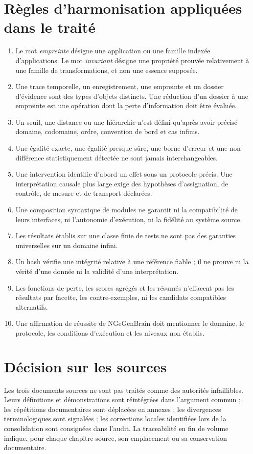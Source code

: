 \documentclass[11pt,oneside]{book}
\theoremstyle{definition}
\theoremstyle{remark}
\newcommand{\1}{\mathbf 1}
\begin{document}
\section{Règles d'harmonisation appliquées dans le traité}
\begin{enumerate}[label=\arabic*.]
\item Le mot \emph{empreinte} désigne une application ou une famille indexée d'applications. Le mot \emph{invariant} désigne une propriété prouvée relativement à une famille de transformations, et non une essence supposée.
\item Une trace temporelle, un enregistrement, une empreinte et un dossier d'évidence sont des types d'objets distincts. Une réduction d'un dossier à une empreinte est une opération dont la perte d'information doit être évaluée.
\item Un seuil, une distance ou une hiérarchie n'est défini qu'après avoir précisé domaine, codomaine, ordre, convention de bord et cas infinis.
\item Une égalité exacte, une égalité presque sûre, une borne d'erreur et une non-différence statistiquement détectée ne sont jamais interchangeables.
\item Une intervention identifie d'abord un effet sous un protocole précis. Une interprétation causale plus large exige des hypothèses d'assignation, de contrôle, de mesure et de transport déclarées.
\item Une composition syntaxique de modules ne garantit ni la compatibilité de leurs interfaces, ni l'autonomie d'exécution, ni la fidélité au système source.
\item Les résultats établis sur une classe finie de tests ne sont pas des garanties universelles sur un domaine infini.
\item Un hash vérifie une intégrité relative à une référence fiable ; il ne prouve ni la vérité d'une donnée ni la validité d'une interprétation.
\item Les fonctions de perte, les scores agrégés et les résumés n'effacent pas les résultats par facette, les contre-exemples, ni les candidats compatibles alternatifs.
\item Une affirmation de réussite de NGeGenBrain doit mentionner le domaine, le protocole, les conditions d'exécution et les niveaux non établis.
\end{enumerate}
\section{Décision sur les sources}
Les trois documents sources ne sont pas traités comme des autorités infaillibles. Leurs définitions et démonstrations sont réintégrées dans l'argument commun ; les répétitions documentaires sont déplacées en annexes ; les divergences terminologiques sont signalées ; les corrections locales identifiées lors de la consolidation sont consignées dans l'audit. La traceabilité en fin de volume indique, pour chaque chapitre source, son emplacement ou sa conservation documentaire.
\end{document}
